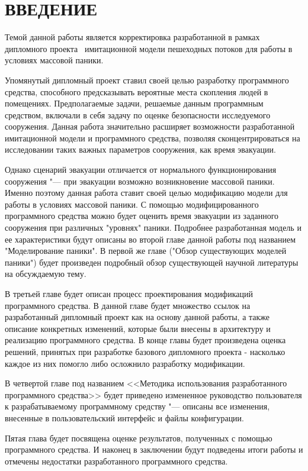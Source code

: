 \chapter*{ВВЕДЕНИЕ}

\label{sec:intro}

Темой данной работы является корректировка разработанной в рамках дипломного проекта~\cite{my_diploma} имитационной модели пешеходных потоков для работы в условиях массовой паники.

Упомянутый дипломный проект ставил своей целью разработку программного средства, способного предсказывать вероятные места скопления людей в помещениях.
Предполагаемые задачи, решаемые данным программным средством, включали в себя задачу по оценке безопасности исследуемого сооружения.
Данная работа значительно расширяет возможности разработанной имитационной модели и программного средства, позволяя сконцентрироваться на исследовании таких важных параметров сооружения, как время эвакуации.

Однако сценарий эвакуации отличается от нормального функционирования сооружения "--- при эвакуации возможно возникновение массовой паники.
Именно поэтому данная работа ставит своей целью модификацию модели для работы в условиях массовой паники.
С помощью модифицированного программного средства можно будет оценить время эвакуации из заданного сооружения при различных "уровнях" паники.
Подробнее разработанная модель и ее характеристики будут описаны во второй главе данной работы под названием "Моделирование паники".
В первой же главе ("Обзор существующих моделей паники") будет произведен подробный обзор существующей научной литературы на обсуждаемую тему.

В третьей главе будет описан процесс проектирования модификаций программного средства.
В данной главе будет множество ссылок на разработанный дипломный проект как на основу данной работы, а также описание конкретных изменений, которые были внесены в архитектуру и реализацию программного средства.
В конце главы будет произведена оценка решений, принятых при разработке базового дипломного проекта - насколько каждое из них помогло либо осложнило разработку модификации.

В четвертой главе под названием <<Методика использования разработанного программного средства>> будет приведено измененное руководство пользователя к разрабатываемому программному средству
"--- описаны все изменения, внесенные в пользовательский интерфейс и файлы конфигурации.

Пятая глава будет посвящена оценке результатов, полученных с помощью программного средства.
И наконец в заключении будут подведены итоги работы и отмечены недостатки разработанного программного средства.
